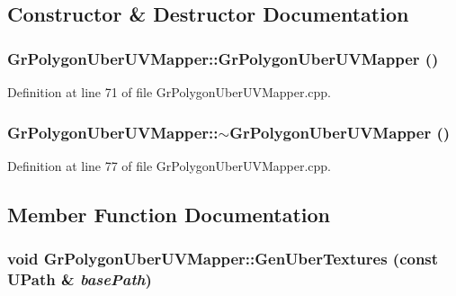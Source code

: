 \begin{CompactItemize}
\subsection{Constructor \& Destructor Documentation}
\hypertarget{class_gr_polygon_uber_u_v_mapper_62445ba98a0326933278328d68aced62}{
\subsubsection[{GrPolygonUberUVMapper}]{\setlength{\rightskip}{0pt plus 5cm}GrPolygonUberUVMapper::GrPolygonUberUVMapper ()}}
\label{class_gr_polygon_uber_u_v_mapper_62445ba98a0326933278328d68aced62}




Definition at line 71 of file GrPolygonUberUVMapper.cpp.\hypertarget{class_gr_polygon_uber_u_v_mapper_64f19e9773d0da6f67365c2ec30ee345}{
\subsubsection[{$\sim$GrPolygonUberUVMapper}]{\setlength{\rightskip}{0pt plus 5cm}GrPolygonUberUVMapper::$\sim$GrPolygonUberUVMapper ()}}
\label{class_gr_polygon_uber_u_v_mapper_64f19e9773d0da6f67365c2ec30ee345}




Definition at line 77 of file GrPolygonUberUVMapper.cpp.

\subsection{Member Function Documentation}
\hypertarget{class_gr_polygon_uber_u_v_mapper_d602be70fe9a07805413c93844ff42c8}{
\subsubsection[{GenUberTextures}]{\setlength{\rightskip}{0pt plus 5cm}void GrPolygonUberUVMapper::GenUberTextures (const {\bf UPath} \& {\em basePath})}}
\label{class_gr_polygon_uber_u_v_mapper_d602be70fe9a07805413c93844ff42c8}





\end{CompactItemize}
